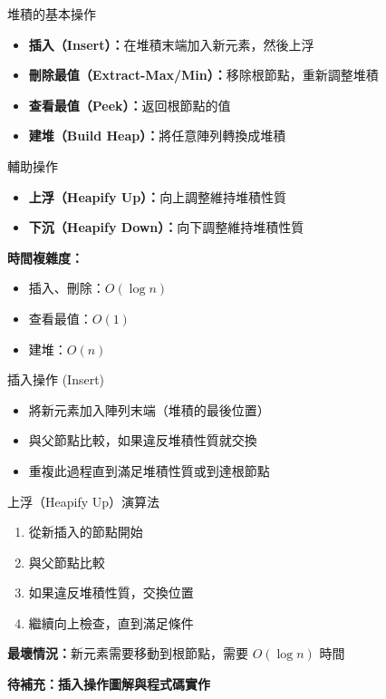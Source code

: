 \documentclass{beamer}
\begin{document}
\begin{frame}{堆積的基本操作}
\begin{itemize}
    \item \textbf{插入（Insert）：}在堆積末端加入新元素，然後上浮
    \item \textbf{刪除最值（Extract-Max/Min）：}移除根節點，重新調整堆積
    \item \textbf{查看最值（Peek）：}返回根節點的值
    \item \textbf{建堆（Build Heap）：}將任意陣列轉換成堆積
\end{itemize}

\vspace{1em}
\begin{block}{輔助操作}
\begin{itemize}
    \item \textbf{上浮（Heapify Up）：}向上調整維持堆積性質
    \item \textbf{下沉（Heapify Down）：}向下調整維持堆積性質
\end{itemize}
\end{block}

\vspace{1em}
\textbf{時間複雜度：}
\begin{itemize}
    \item 插入、刪除：$O(\log n)$
    \item 查看最值：$O(1)$
    \item 建堆：$O(n)$
\end{itemize}
\end{frame}

\begin{frame}{插入操作 (Insert)}
\begin{itemize}
    \item 將新元素加入陣列末端（堆積的最後位置）
    \item 與父節點比較，如果違反堆積性質就交換
    \item 重複此過程直到滿足堆積性質或到達根節點
\end{itemize}

\vspace{1em}
\begin{block}{上浮（Heapify Up）演算法}
\begin{enumerate}
    \item 從新插入的節點開始
    \item 與父節點比較
    \item 如果違反堆積性質，交換位置
    \item 繼續向上檢查，直到滿足條件
\end{enumerate}
\end{block}

\vspace{1em}
\textbf{最壞情況：}新元素需要移動到根節點，需要 $O(\log n)$ 時間

\vspace{1em}
\textbf{待補充：插入操作圖解與程式碼實作}
\end{frame}
\end{document}
